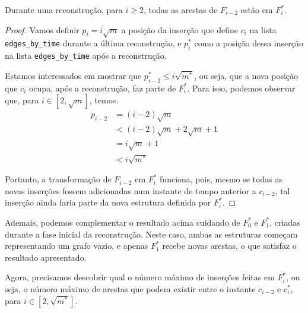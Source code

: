 \begin{theorem}
    \label{teo:adicao-arestas}
    Durante uma reconstrução, para $i \geq 2$, todas as arestas de $F_{i-2}$ estão em $F_i^*$.
\end{theorem}
\begin{proof}

    Vamos definir $p_i = i \sqrt{m}$ a posição da inserção que define $c_i$ na lista \texttt{edges\_by\_time} durante a última reconstrução, e $p_i^*$ como a posição dessa inserção na lista \texttt{edges\_by\_time} após a reconstrução.

    Estamos interessados em mostrar que $p_{i-2}^* \leq i\sqrt{m^*}$, ou seja, que a nova posição que $c_i$ ocupa, após a reconstrução, faz parte de $F_i^*$. Para isso, podemos observar que, para $i \in [2, \sqrt{m}]$, temos:
    \begin{align*}
        p_{i-2} & = (i-2) \sqrt{m}                 \\
                & < (i-2) \sqrt{m} + 2\sqrt{m} + 1 \\
                & = i \sqrt{m} + 1                 \\
                & < i \sqrt{m^*}
    \end{align*}

    Portanto, a transformação de $F_{i-2}$ em $F_i^*$ funciona, pois, mesmo se todas as novas inserções fossem adicionadas num instante de tempo anterior a $c_{i-2}$, tal inserção ainda faria parte da nova estrutura definida por $F_i^*$.
\end{proof}

Ademais, podemos complementar o resultado acima cuidando de $F_0^*$ e $F_1^*$, criadas durante a fase inicial da reconstrução. Neste caso, ambas as estruturas começam representando um grafo vazio, e apenas $F_1^*$ recebe novas arestas, o que satisfaz o resultado apresentado.

Agora, precisamos descobrir qual o número máximo de inserções feitas em $F_i^*$, ou seja, o número máximo de arestas que podem existir entre o instante $c_{i-2}$ e $c_i^*$, para $i \in [2,\sqrt{m^*}]$.

